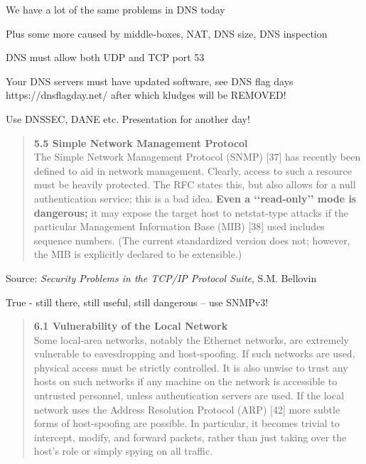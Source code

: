 \documentclass[Screen16to9,17pt]{foils}
\begin{document}
\begin{list1}
\item We have a lot of the same problems in DNS today
\item Plus some more caused by middle-boxes, NAT, DNS size, DNS inspection
\begin{list2}
\item DNS must allow both UDP and TCP port 53
\item Your DNS servers must have updated software, see DNS flag days\\ https://dnsflagday.net/ after which kludges will be REMOVED!
\item Use DNSSEC, DANE etc. Presentation for another day!
\end{list2}
\end{list1}


\begin{quote}
{\bf 5.5 Simple Network Management Protocol}\\
The Simple Network Management Protocol (SNMP) [37] has recently been defined to aid in network management. Clearly, access to such a resource must be heavily protected. The RFC states this, but also allows for a null authentication service; this is a bad idea. {\bf Even a ‘‘read-only’’ mode is dangerous;} it may expose the target host to netstat-type attacks if the particular Management Information Base (MIB) [38] used includes sequence numbers. (The current standardized version does not; however, the MIB is explicitly declared to be extensible.)
\end{quote}
Source: \emph{Security Problems in the TCP/IP Protocol Suite}, S.M. Bellovin\\

True - still there, still useful, still dangerous -- use SNMPv3!


\begin{quote}
{\bf 6.1 Vulnerability of the Local Network}\\
Some local-area networks, notably the Ethernet networks, are extremely vulnerable to eavesdropping and
host-spoofing. If such networks are used, physical access must be strictly controlled. It is also unwise
to trust any hosts on such networks if any machine on the network is accessible to untrusted personnel,
unless authentication servers are used.
If the local network uses the Address Resolution Protocol (ARP) [42] more subtle forms of host-spoofing
are possible. In particular, it becomes trivial to intercept, modify, and forward packets, rather than just
taking over the host’s role or simply spying on all traffic.
\end{quote}
\end{document}
